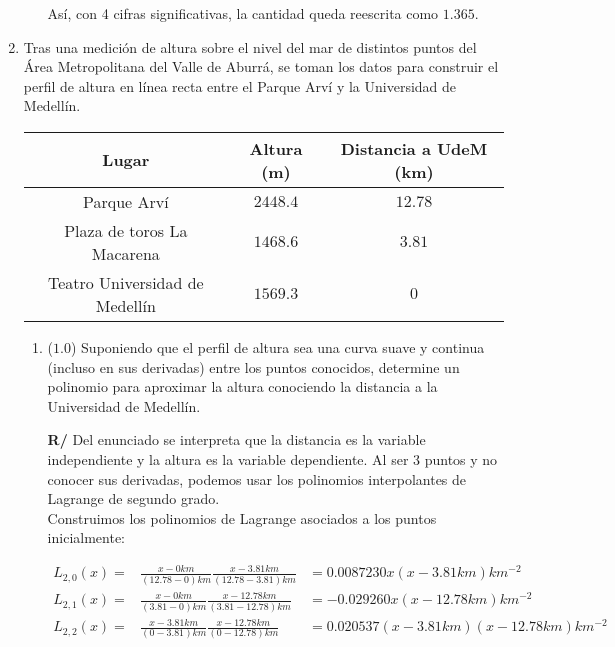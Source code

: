 \documentclass[12pt]{article}
\begin{document}
\begin{enumerate}[leftmargin=*,widest=9]
\begin{enumerate}[label=\alph*]
Así, con 4 cifras significativas, la cantidad queda reescrita como \(1.365\).

    \end{enumerate}

    \item %
    Tras una medición de altura sobre el nivel del mar de distintos puntos del Área Metropolitana del Valle de Aburrá, se toman los datos para construir el perfil de altura en línea recta entre el Parque Arví y la Universidad de Medellín.
    \begin{center}
    \begin{tabular}{|c|c|c|}
    \hline
    Lugar & Altura (m) & Distancia a UdeM (km) \\
    \hline
    Parque Arví & \(2448.4\) & \(12.78\) \\
    Plaza de toros La Macarena & \(1468.6\) & \(3.81\) \\
    Teatro Universidad de Medellín & \(1569.3\) & \(0\) \\
    \hline
    \end{tabular}
    \end{center}

    \begin{enumerate}[label=\alph*]
    \item (\(1.0\)) Suponiendo que el perfil de altura sea una curva suave y continua (incluso en sus derivadas) entre los puntos conocidos, determine un polinomio para aproximar la altura conociendo la distancia a la Universidad de Medellín.

\textbf{R/} Del enunciado se interpreta que la distancia es la variable independiente y la altura es la variable dependiente. Al ser 3 puntos y no conocer sus derivadas, podemos usar los polinomios interpolantes de Lagrange de segundo grado.\\
Construimos los polinomios de Lagrange asociados a los puntos inicialmente:

\begin{eqnarray*}
L_{2,0}(x) = & \frac{x-0km}{(12.78 -0)km}\frac{x-3.81km}{(12.78 - 3.81)km} &= 0.0087230x(x-3.81km)km^{-2}\\
L_{2,1}(x) = & \frac{x-0km}{(3.81 - 0)km}\frac{x-12.78km}{(3.81 - 12.78)km} & = -0.029260x(x-12.78km)km^{-2}\\
L_{2,2}(x) = & \frac{x-3.81 km}{(0-3.81)km} \frac{x-12.78km}{(0-12.78)km} & = 0.020537(x-3.81km)(x-12.78km)km^{-2}
\end{eqnarray*}


\end{enumerate}
\end{enumerate}
\end{document}
